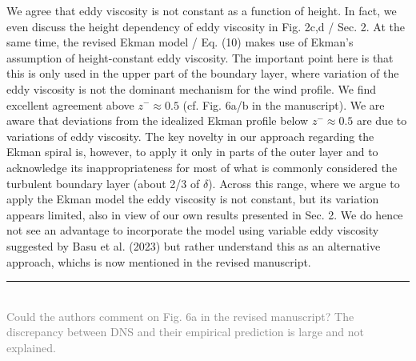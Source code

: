 \documentclass[a4paper,10pt]{article}
\newcommand{\revpoint}[3] 
{ \hrule ~\\[0.5em]
\noindent\textcolor{gray}{\noindent#1} \\[0.5em]  
\noindent\textcolor{blue}{\textit{\noindent#2}} \\[0.5em]
\noindent\textcolor{black}{\noindent{#3}} \\[0.5em]
}
\begin{document}
  {We agree that eddy viscosity is not constant as a function of height. In fact, we even discuss the height dependency of eddy viscosity in Fig. 2c,d / Sec. 2. At the same time, the revised Ekman model / Eq. (10) makes use of Ekman's assumption of height-constant eddy viscosity. The important point here is that this is only used in the upper part of the boundary layer, where variation of the eddy viscosity is not the dominant mechanism for the wind profile. We find excellent agreement above $z^-\approx 0.5$ (cf. Fig. 6a/b in the manuscript). We are aware that deviations from the idealized Ekman profile below $z^-\approx 0.5$ are due to variations of eddy viscosity. 
  The key novelty in our approach regarding the Ekman spiral is, however, to apply it only in parts of the outer layer and to acknowledge its inappropriateness for most of what is commonly considered the turbulent boundary layer (about 2/3 of $\delta$). Across this range, where we argue to apply the Ekman model the eddy viscosity is not constant, but its variation appears limited, also in view of our own results presented in Sec. 2. We do hence not see an advantage to incorporate the model using variable eddy viscosity suggested by Basu et al. (2023) but rather understand this as an alternative approach, whichs is now mentioned in the revised manuscript.}{}

\revpoint{Could the authors comment on Fig. 6a in the revised manuscript? The discrepancy between DNS and
  their empirical prediction is large and not explained.
}{}{}
\end{document}
